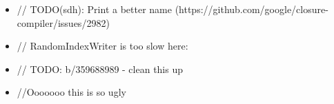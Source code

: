 \begin{itemize}[itemsep=-2pt]
    \item \textcolor{commentColor}{// TODO(sdh): Print a better name (https://github.com/\allowbreak google/closure-compiler/issues/2982)}
    \item \textcolor{commentColor}{// RandomIndexWriter is too slow here:}
    \item \textcolor{commentColor}{// TODO: b/359688989 - clean this up}
    \item \textcolor{commentColor}{//Ooooooo this is so ugly}
\end{itemize}



